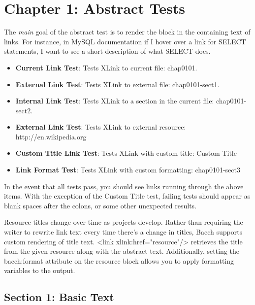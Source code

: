 \documentclass[openright,pdflatex,10pt]{book}
\begin{document}
\chapter*{Chapter 1: Abstract Tests}


The \emph{main} goal of the abstract test is to render the block in the containing text of links.  For instance, in MySQL documentation if I hover over a link for SELECT statements, I want to see a short description of what SELECT does.


\begin{itemize}
\item
      \textbf{Current Link Test}: Tests XLink to current file: chap0101.

\item
      \textbf{External Link Test}: Tests XLink to external file: chap0101-sect1.

\item
      \textbf{Internal Link Test}: Tests XLink to a section in the current file: chap0101-sect2.

\item
      \textbf{External Link Test}: Tests XLink to external resource: http://en.wikipedia.org
\item
      \textbf{Custom Title Link Test}: Tests XLink with custom title: Custom Title
\item
      \textbf{Link Format Test}: Tests XLink with custom formatting: chap0101-sect3

\end{itemize}


In the event that all tests pass, you should see links running through the above items.  With the exception of the Custom Title test, failing tests should appear as blank spaces after the colons, or some other unexpected results.



Resource titles change over time as projects develop.  Rather than requiring the writer to rewrite link text every time there's a change in titles, Bacch supports custom rendering of title text. <link xlink:href="resource"/> retrieves the title from the given resource along with the abstract text.  Additionally, setting the bacch:format attribute on the resource block allows you to apply formatting variables to the output.

\section*{Section 1: Basic Text}
\end{document}
